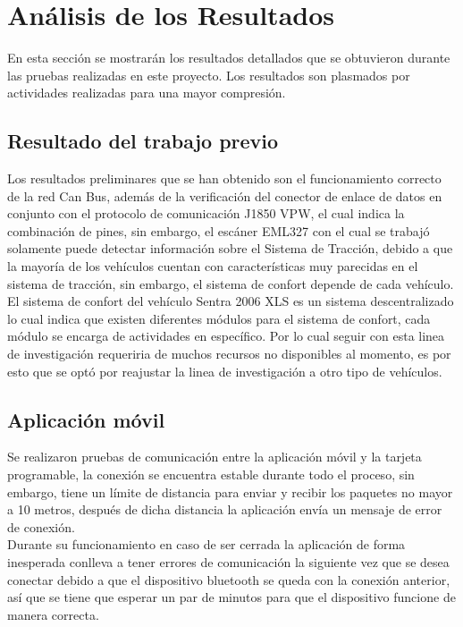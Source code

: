\section{Análisis de los Resultados}

En esta sección se mostrarán los resultados detallados que se obtuvieron durante las pruebas realizadas en este proyecto. Los resultados son plasmados por actividades realizadas para una mayor compresión.\\

\subsection {Resultado del trabajo previo}

Los resultados preliminares que se han obtenido son el funcionamiento correcto de la red Can Bus, además de la verificación del conector de enlace de datos en conjunto con el protocolo de comunicación J1850 VPW, el cual indica la combinación de pines, sin embargo, el escáner EML327 con el cual se trabajó solamente puede detectar información sobre el Sistema de Tracción, debido a que la mayoría de los vehículos cuentan con características muy parecidas en el sistema de tracción, sin embargo, el sistema de confort depende de cada vehículo.\\

El sistema de confort del vehículo Sentra 2006 XLS es un sistema descentralizado lo cual indica que existen diferentes módulos para el sistema de confort, cada módulo se encarga de actividades en específico. Por lo cual seguir con esta linea de investigación requeriria de muchos recursos no disponibles al momento, es por esto que se optó por reajustar la linea de investigación a otro tipo de vehículos.



\subsection {Aplicación móvil}

Se realizaron pruebas de comunicación entre la aplicación móvil y la tarjeta programable, la conexión se encuentra estable durante todo el proceso, sin embargo, tiene un límite de distancia para enviar y recibir los paquetes no mayor a 10 metros, después de dicha distancia la aplicación envía un mensaje de error de conexión.\\

Durante su funcionamiento en caso de ser cerrada la aplicación de forma inesperada conlleva a tener errores de comunicación la siguiente vez que se desea conectar debido a que el dispositivo bluetooth se queda con la conexión anterior, así que se tiene que esperar un par de minutos para que el dispositivo funcione de manera correcta.\\

